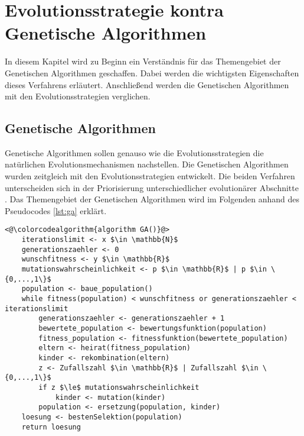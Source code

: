 \section{Evolutionsstrategie kontra Genetische Algorithmen}
In diesem Kapitel wird zu Beginn ein Verständnis für das Themengebiet der Genetischen Algorithmen geschaffen. Dabei werden die wichtigsten Eigenschaften dieses Verfahrens erläutert. Anschließend werden die Genetischen Algorithmen mit den Evolutionsstrategien verglichen.


\subsection{Genetische Algorithmen}
Genetische Algorithmen sollen genauso wie die Evolutionsstrategien die natürlichen Evolutionsmechanismen nachstellen.
Die Genetischen Algorithmen wurden zeitgleich mit den Evolutionsstrategien entwickelt. Die beiden Verfahren unterscheiden sich in der Priorisierung unterschiedlicher evolutionärer Abschnitte \cite[S.~185]{schoeneburg}.
Das Themengebiet der Genetischen Algorithmen wird im Folgenden anhand des Pseudocodes \ref{lst:ga} erklärt.

\begin{lstlisting}[caption={Grundlegender Genetischer Algorithmus}, firstnumber=1, captionpos=b, label=lst:ga]
<@\colorcodealgorithm{algorithm GA()}@>
	iterationslimit <- x $\in \mathbb{N}$
	generationszaehler <- 0
	wunschfitness <- y $\in \mathbb{R}$
	mutationswahrscheinlichkeit <- p $\in \mathbb{R}$ | p $\in \{0,...,1\}$
	population <- baue_population()
	while fitness(population) < wunschfitness or generationszaehler < iterationslimit
		generationszaehler <- generationszaehler + 1
		bewertete_population <- bewertungsfunktion(population)
		fitness_population <- fitnessfunktion(bewertete_population)
		eltern <- heirat(fitness_population)
		kinder <- rekombination(eltern)
		z <- Zufallszahl $\in \mathbb{R}$ | Zufallszahl $\in \{0,...,1\}$
		if z $\le$ mutationswahrscheinlichkeit 
			kinder <- mutation(kinder)
		population <- ersetzung(population, kinder)
	loesung <- bestenSelektion(population)
	return loesung
\end{lstlisting}

